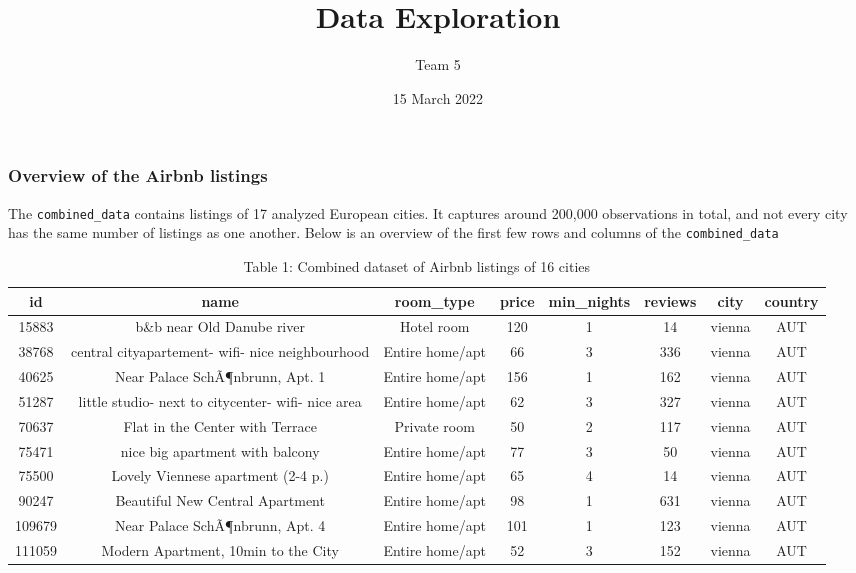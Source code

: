 \documentclass[
]{article}
\title{Data Exploration}
\author{Team 5}
\date{15 March 2022}
\begin{document}
\maketitle

\hypertarget{overview-of-the-airbnb-listings}{%
\subsubsection{Overview of the Airbnb
listings}\label{overview-of-the-airbnb-listings}}

The \texttt{combined\_data} contains listings of 17 analyzed European
cities. It captures around 200,000 observations in total, and not every
city has the same number of listings as one another. Below is an
overview of the first few rows and columns of the
\texttt{combined\_data}

\begin{table}

\caption{\label{tab:load_dataset_as_table}Table 1: Combined dataset of Airbnb listings of 16 cities}
\centering
\begin{tabular}[t]{c|c|c|c|c|c|c|c}
\hline
id & name & room\_type & price & min\_nights & reviews & city & country\\
\hline
15883 & b\&b near Old Danube river & Hotel room & 120 & 1 & 14 & vienna & AUT\\
\hline
38768 & central cityapartement- wifi- nice neighbourhood & Entire home/apt & 66 & 3 & 336 & vienna & AUT\\
\hline
40625 & Near Palace SchÃ¶nbrunn, Apt. 1 & Entire home/apt & 156 & 1 & 162 & vienna & AUT\\
\hline
51287 & little studio- next to citycenter- wifi- nice area & Entire home/apt & 62 & 3 & 327 & vienna & AUT\\
\hline
70637 & Flat in the Center with Terrace & Private room & 50 & 2 & 117 & vienna & AUT\\
\hline
75471 & nice big apartment with balcony & Entire home/apt & 77 & 3 & 50 & vienna & AUT\\
\hline
75500 & Lovely Viennese apartment (2-4 p.) & Entire home/apt & 65 & 4 & 14 & vienna & AUT\\
\hline
90247 & Beautiful New Central Apartment & Entire home/apt & 98 & 1 & 631 & vienna & AUT\\
\hline
109679 & Near Palace SchÃ¶nbrunn, Apt. 4 & Entire home/apt & 101 & 1 & 123 & vienna & AUT\\
\hline
111059 & Modern Apartment, 10min to the City & Entire home/apt & 52 & 3 & 152 & vienna & AUT\\
\hline
\end{tabular}
\end{table}
\end{document}
